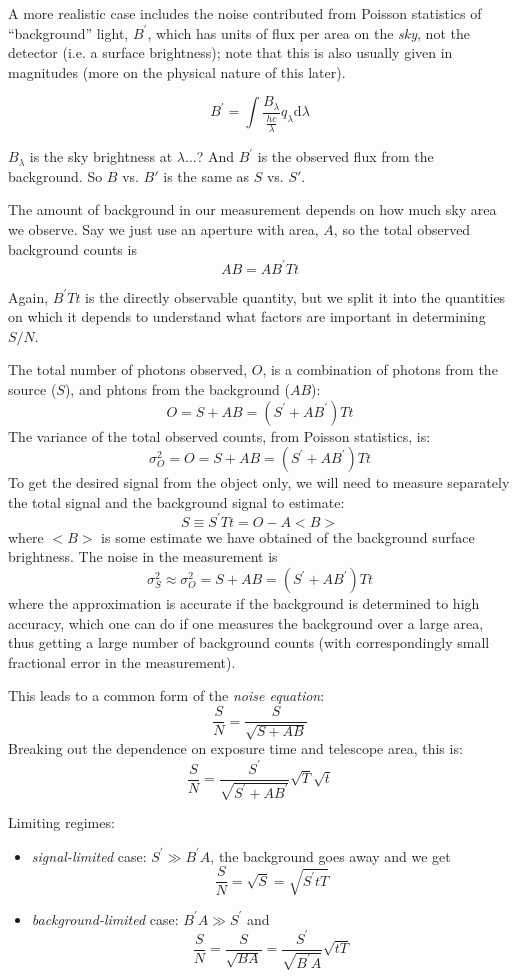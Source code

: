 \documentclass[12pt]{article}
\begin{document}
A more realistic case includes the noise contributed from Poisson
statistics of ``background'' light, $B^{\prime}$,
which has units of flux per area
on the \emph{sky}, not the detector
(i.e. a surface brightness); note that this is also usually
given in magnitudes (more on the physical nature of
this later).

    $$ B^{\prime} = \int \frac{B_{\lambda}}{\frac{hc}{\lambda}}
       q_{\lambda}\textrm{d}\lambda $$

\textcolor{myBlue}{$B_{\lambda}$ is the sky brightness at $\lambda
\ldots$? And $B^{\prime}$ is the observed flux from the background.
So $B$ vs. $B'$ is the same as $S$ vs. $S'$.}

The amount of background in our measurement depends on
how much sky area we observe. Say we just
use an aperture with area, $A$, so the total observed background counts
is
    $$ AB = AB^{\prime}Tt $$

Again, $B^{\prime}Tt$ is the directly observable quantity,
but we split it into the quantities on which it depends to understand
what factors are important in determining $S/N$.

The total number of photons observed, $O$, is a combination of
photons from the source ($S$), and phtons from the background ($AB$):
    $$ O = S + AB = (S^{\prime} + AB^{\prime})Tt $$
The variance of the total observed counts, from Poisson statistics,
is:
    $$ \sigma^2_O = O =  S + AB = (S^{\prime} + AB^{\prime})Tt $$
To get the desired signal from the object only, we will need to
measure separately the total signal and the background signal to
estimate:
    $$ S \equiv S^{\prime}Tt = O-A <B> $$
where $<B>$ is some estimate we have obtained of the background
surface brightness. The noise in the measurement is
    $$ \sigma^2_S \approx \sigma^2_O =
    S + AB = (S^{\prime} + AB^{\prime})Tt $$
where the approximation is accurate if the background is determined to
high accuracy, which one can do if one measures the background over a
large area, thus getting a large number of background counts (with
correspondingly small fractional error in the measurement).

This leads to a common form of the \emph{noise equation}:
    $$ \frac{S}{N} = \frac{S}{\sqrt{S+AB}}  $$
Breaking out the dependence on exposure time and telescope area, this
is:
    $$ \frac{S}{N} = \frac{S^{\prime}}
    {\sqrt{S^{\prime}+AB^{\prime}}}
    \sqrt{T}\sqrt{t}$$

Limiting regimes:
\begin{itemize}
    \item \emph{signal-limited} case: $S^{\prime}\gg B^{\prime}A$,
        the background goes away and we get
         $$ \frac{S}{N} = \sqrt{S} = \sqrt{S^{\prime}tT} $$
    \item \emph{background-limited} case: $B^{\prime}A\gg S^{\prime}$
        and
        $$ \frac{S}{N} = \frac{S}{\sqrt{BA}} =
        \frac{S^{\prime}}{\sqrt{B^{\prime}A}}\sqrt{tT} $$
\end{itemize}
\end{document}
